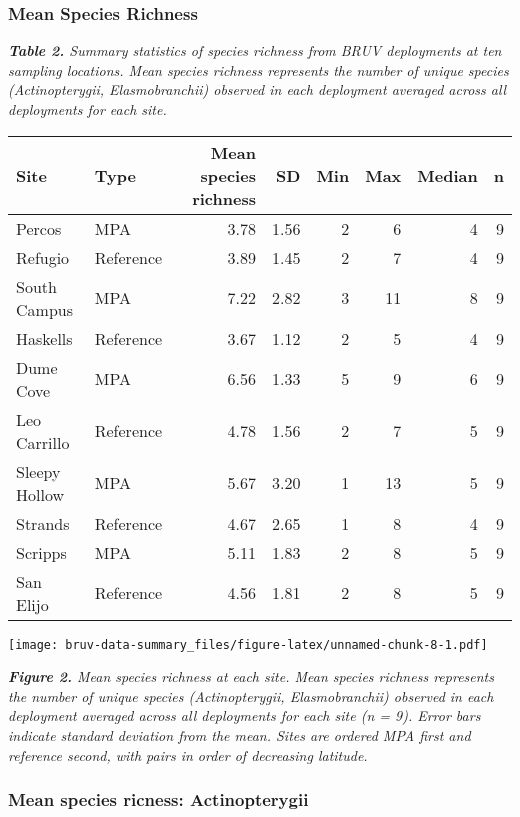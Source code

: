 \documentclass[]{article}
\begin{document}
\subsubsection{Mean Species Richness}\label{mean-species-richness}

\emph{\textbf{Table 2.} Summary statistics of species richness from BRUV
deployments at ten sampling locations. Mean species richness represents
the number of unique species (Actinopterygii, Elasmobranchii) observed
in each deployment averaged across all deployments for each site.}

\begin{table}[H]
\centering
\begin{tabular}{l|l|r|r|r|r|r|r}
\hline
Site & Type & Mean species richness & SD & Min & Max & Median & n\\
\hline
Percos & MPA & 3.78 & 1.56 & 2 & 6 & 4 & 9\\
\hline
Refugio & Reference & 3.89 & 1.45 & 2 & 7 & 4 & 9\\
\hline
South Campus & MPA & 7.22 & 2.82 & 3 & 11 & 8 & 9\\
\hline
Haskells & Reference & 3.67 & 1.12 & 2 & 5 & 4 & 9\\
\hline
Dume Cove & MPA & 6.56 & 1.33 & 5 & 9 & 6 & 9\\
\hline
Leo Carrillo & Reference & 4.78 & 1.56 & 2 & 7 & 5 & 9\\
\hline
Sleepy Hollow & MPA & 5.67 & 3.20 & 1 & 13 & 5 & 9\\
\hline
Strands & Reference & 4.67 & 2.65 & 1 & 8 & 4 & 9\\
\hline
Scripps & MPA & 5.11 & 1.83 & 2 & 8 & 5 & 9\\
\hline
San Elijo & Reference & 4.56 & 1.81 & 2 & 8 & 5 & 9\\
\hline
\end{tabular}
\end{table}

\texttt{[image: bruv-data-summary\_files/figure-latex/unnamed-chunk-8-1.pdf]}

\emph{\textbf{Figure 2.} Mean species richness at each site. Mean
species richness represents the number of unique species
(Actinopterygii, Elasmobranchii) observed in each deployment averaged
across all deployments for each site (n = 9). Error bars indicate
standard deviation from the mean. Sites are ordered MPA first and
reference second, with pairs in order of decreasing latitude.}

\subsubsection{Mean species ricness:
Actinopterygii}\label{mean-species-ricness-actinopterygii}
\end{document}
